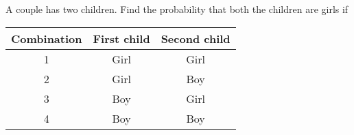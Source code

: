 
%
%
%
%
% 
% 

\question \begin{fullwidth} A couple has two children. Find the probability that both 
the children are girls if \end{fullwidth}


\ifprintanswers
  \begin{table}
  	\begin{tabular}{ccc}
  	   \toprule
  	   Combination & First child & Second child \\
  	   \midrule
  	   1 & Girl & Girl \\
  	   2 & Girl & Boy \\
  	   3 & Boy & Girl \\
  	   4 & Boy & Boy \\
  	   \bottomrule
  	\end{tabular}
  \end{table}
\fi 

